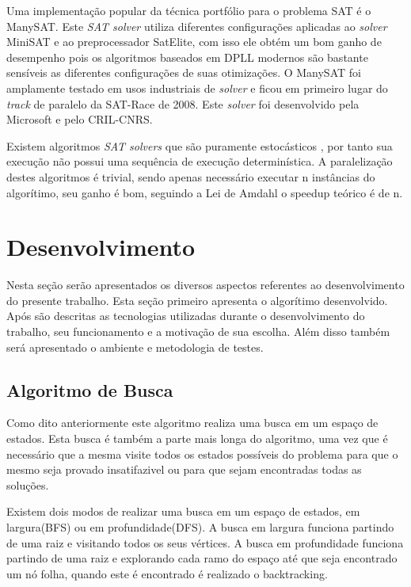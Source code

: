 \documentclass{ufsc-thesis}
\begin{document}
Uma implementação popular da técnica portfólio para o problema SAT é o ManySAT\cite{Hamadi09manysat}. 
Este \textit{SAT solver} utiliza diferentes configurações aplicadas ao \textit{solver} 
MiniSAT e ao preprocessador SatElite, com isso ele obtém um bom ganho de desempenho 
pois os algoritmos baseados em DPLL modernos são bastante sensíveis as diferentes 
configurações de suas otimizações. O ManySAT foi amplamente testado em usos industriais 
de \textit{solver} e ficou em primeiro lugar do \textit{track} de paralelo da SAT-Race de 2008.
Este \textit{solver} foi desenvolvido pela Microsoft e pelo CRIL-CNRS.

Existem algoritmos \textit{SAT solvers} que são puramente estocásticos\allowbreak\cite{pprobSAT}
, por tanto sua execução não possui uma sequência de execução determinística. 
A paralelização destes algoritmos é trivial, sendo apenas necessário executar n 
instâncias do algorítimo, seu ganho é bom, seguindo a Lei de Amdahl o speedup 
teórico é de n.

\chapter{Desenvolvimento}

Nesta seção serão apresentados os diversos aspectos referentes ao desenvolvimento
do presente trabalho. Esta seção primeiro apresenta o algorítimo desenvolvido. Após são 
descritas as tecnologias utilizadas durante o desenvolvimento do trabalho, seu 
funcionamento e a motivação de sua escolha. Além disso também será apresentado o ambiente 
e metodologia de testes.

\section{Algoritmo de Busca}

Como dito anteriormente este algoritmo realiza uma busca em um espaço de estados. Esta busca 
é também a parte mais longa do algoritmo, uma vez que é necessário que a mesma visite todos os
estados possíveis do problema para que o mesmo seja provado insatifazivel ou para que sejam encontradas 
todas as soluções.

Existem dois modos de realizar uma busca em um espaço de estados, em largura(BFS) ou em profundidade(DFS). 
A busca em largura funciona partindo de uma raiz e visitando todos os seus vértices. A busca em profundidade 
funciona partindo de uma raiz e explorando cada ramo do espaço até que seja encontrado um nó folha, 
quando este é encontrado é realizado o backtracking.
\end{document}
